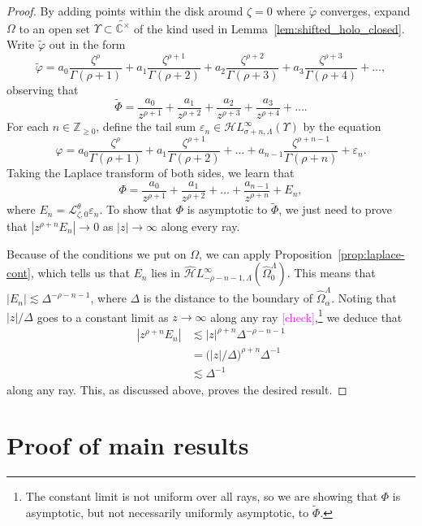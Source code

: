 \documentclass{article}
\newcommand{\singexp}[2]{\mathcal{H}L^\infty_{#1, #2}}
\newcommand{\dualsingexp}[2]{\widehat{\mathcal{H}}L^\infty_{#1, #2}}
\newcommand{\Z}{\mathbb{Z}}
\newcommand{\C}{\mathbb{C}}
\newcommand{\series}[1]{\tilde{#1}}
\newcommand{\laplace}{\mathcal{L}}
\theoremstyle{definition}
\theoremstyle{plain}
\begin{document}
\begin{proof}
By adding points within the disk around $\zeta = 0$ where $\series{\varphi}$ converges, expand $\Omega$ to an open set $\Upsilon \subset \widetilde{\C^\times}$ of the kind used in Lemma~\ref{lem:shifted_holo_closed}. Write $\series{\varphi}$ out in the form
\[ \series{\varphi} = a_0 \frac{\zeta^\rho}{\Gamma(\rho+1)} + a_1 \frac{\zeta^{\rho+1}}{\Gamma(\rho+2)} + a_2 \frac{\zeta^{\rho+2}}{\Gamma(\rho+3)} + a_3 \frac{\zeta^{\rho+3}}{\Gamma(\rho+4)} + \ldots, \]
observing that
\[ \series{\Phi} = \frac{a_0}{z^{\rho+1}} + \frac{a_1}{z^{\rho+2}} + \frac{a_2}{z^{\rho+3}} + \frac{a_3}{z^{\rho+4}} + \ldots. \]
For each $n \in \Z_{\ge 0}$, define the tail sum $\varepsilon_n \in \singexp{\sigma+n}{\Lambda}(\Upsilon)$ by the equation
\[ \varphi = a_0 \frac{\zeta^\rho}{\Gamma(\rho+1)} + a_1 \frac{\zeta^{\rho+1}}{\Gamma(\rho+2)} + \ldots + a_{n-1} \frac{\zeta^{\rho+n-1}}{\Gamma(\rho+n)} + \varepsilon_n. \]
Taking the Laplace transform of both sides, we learn that
\[ \Phi = \frac{a_0}{z^{\rho+1}} + \frac{a_1}{z^{\rho+2}} + \ldots + \frac{a_{n-1}}{z^{\rho+n}} + E_n, \]
where $E_n = \laplace_{\zeta, 0}^\theta \varepsilon_n$. To show that $\Phi$ is asymptotic to $\series{\Phi}$, we just need to prove that $|z^{\rho+n} E_n| \to 0$ as $|z| \to \infty$ along every ray.

Because of the conditions we put on $\Omega$, we can apply Proposition~\ref{prop:laplace-cont}, which tells us that $E_n$ lies in $\dualsingexp{-\rho-n-1}{\Lambda}(\widehat{\Omega}_0^\Lambda)$. This means that $|E_n| \lesssim \Delta^{-\rho-n-1}$, where $\Delta$ is the distance to the boundary of $\widehat{\Omega}_\alpha^\Lambda$. Noting that $|z|/\Delta$ goes to a constant limit as $z \to \infty$ along any ray \textcolor{magenta}{[check]},\footnote{The constant limit is not uniform over all rays, so we are showing that $\Phi$ is asymptotic, but not necessarily uniformly asymptotic, to $\series{\Phi}$.} we deduce that
\begin{align*}
|z^{\rho+n} E_n| & \lesssim |z|^{\rho+n} \Delta^{-\rho-n-1} \\
& = \big(|z|/\Delta\big)^{\rho+n} \Delta^{-1} \\
& \lesssim \Delta^{-1}
\end{align*}
along any ray. This, as discussed above, proves the desired result.
\end{proof}
\color{black}
\section{Proof of main results}\label{sec:proof_main_results}
\end{document}
